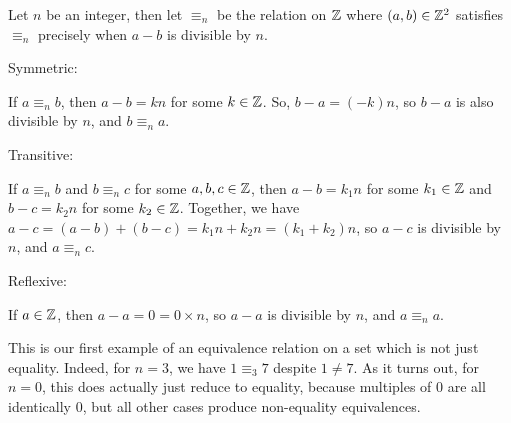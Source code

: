 \begin{example}
    Let $n$ be an integer, then let $\equiv_n$ be the relation on $\mathbb{Z}$ where $(a,b) \in \mathbb{Z}^2$ satisfies $\equiv_n$ precisely when $a - b$ is divisible by $n$.

    \medskip\noindent
    Symmetric:
    
    \noindent
    If $a \equiv_n b$, then $a - b = kn$ for some $k \in \mathbb{Z}$. So, $b - a = (-k)n$, so $b - a$ is also divisible by $n$, and $b \equiv_n a$.

    \medskip\noindent
    Transitive:

    \noindent
    If $a \equiv_n b$ and $b \equiv_n c$ for some $a,b,c \in \mathbb{Z}$, then $a - b = k_1n$ for some $k_1 \in \mathbb{Z}$ and $b - c = k_2n$ for some $k_2 \in \mathbb{Z}$. Together, we have $a - c = (a - b) + (b - c) = k_1n + k_2n = (k_1 + k_2)n$, so $a-c$ is divisible by $n$, and $a \equiv_n c$.

    \medskip\noindent
    Reflexive:

    \noindent
    If $a \in \mathbb{Z}$, then $a - a = 0 = 0\times n$, so $a - a$ is divisible by $n$, and $a \equiv_n a$.
\end{example}
\begin{remark}
    This is our first example of an equivalence relation on a set which is not just equality. Indeed, for $n = 3$, we have $1 \equiv_3 7$ despite $1 \ne 7$. As it turns out, for $n = 0$, this does actually just reduce to equality, because multiples of 0 are all identically 0, but all other cases produce non-equality equivalences.
\end{remark}

